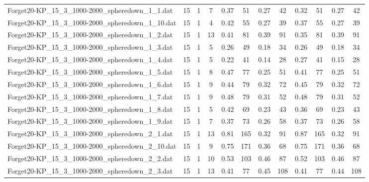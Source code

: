 \begin{sidewaystable}[!ht]
{\begin{tabular}{lccccccccccc}
Forget20-KP\_15\_3\_1000-2000\_spheredown\_1\_1.dat & 15 & 1 & 7 & 0.37 & 51 &  \textcolor{blue2}{0.27} & 42 & 0.32 & 51 &  \textcolor{blue2}{0.27} & 42 \\
Forget20-KP\_15\_3\_1000-2000\_spheredown\_1\_10.dat & 15 & 1 & 4 & 0.42 & 55 &  \textcolor{blue2}{0.27} & 39 & 0.37 & 55 &  \textcolor{blue2}{0.27} & 39 \\
Forget20-KP\_15\_3\_1000-2000\_spheredown\_1\_2.dat & 15 & 1 & 13 & 0.41 & 81 & 0.39 & 91 &  \textcolor{blue2}{0.35} & 81 & 0.39 & 91 \\
Forget20-KP\_15\_3\_1000-2000\_spheredown\_1\_3.dat & 15 & 1 & 5 & 0.26 & 49 &  \textcolor{blue2}{0.18} & 34 & 0.26 & 49 &  \textcolor{blue2}{0.18} & 34 \\
Forget20-KP\_15\_3\_1000-2000\_spheredown\_1\_4.dat & 15 & 1 & 5 & 0.22 & 41 &  \textcolor{blue2}{0.14} & 28 & 0.27 & 41 & 0.15 & 28 \\
Forget20-KP\_15\_3\_1000-2000\_spheredown\_1\_5.dat & 15 & 1 & 8 & 0.47 & 77 &  \textcolor{blue2}{0.25} & 51 & 0.41 & 77 &  \textcolor{blue2}{0.25} & 51 \\
Forget20-KP\_15\_3\_1000-2000\_spheredown\_1\_6.dat & 15 & 1 & 9 & 0.44 & 79 &  \textcolor{blue2}{0.32} & 72 & 0.45 & 79 &  \textcolor{blue2}{0.32} & 72 \\
Forget20-KP\_15\_3\_1000-2000\_spheredown\_1\_7.dat & 15 & 1 & 9 & 0.48 & 79 &  \textcolor{blue2}{0.31} & 52 & 0.48 & 79 &  \textcolor{blue2}{0.31} & 52 \\
Forget20-KP\_15\_3\_1000-2000\_spheredown\_1\_8.dat & 15 & 1 & 5 & 0.42 & 69 &  \textcolor{blue2}{0.23} & 43 & 0.36 & 69 &  \textcolor{blue2}{0.23} & 43 \\
Forget20-KP\_15\_3\_1000-2000\_spheredown\_1\_9.dat & 15 & 1 & 7 & 0.37 & 73 &  \textcolor{blue2}{0.26} & 58 & 0.37 & 73 &  \textcolor{blue2}{0.26} & 58 \\
Forget20-KP\_15\_3\_1000-2000\_spheredown\_2\_1.dat & 15 & 1 & 13 & 0.81 & 165 &  \textcolor{blue2}{0.32} & 91 & 0.87 & 165 &  \textcolor{blue2}{0.32} & 91 \\
Forget20-KP\_15\_3\_1000-2000\_spheredown\_2\_10.dat & 15 & 1 & 9 & 0.75 & 171 &  \textcolor{blue2}{0.36} & 68 & 0.75 & 171 &  \textcolor{blue2}{0.36} & 68 \\
Forget20-KP\_15\_3\_1000-2000\_spheredown\_2\_2.dat & 15 & 1 & 10 & 0.53 & 103 &  \textcolor{blue2}{0.46} & 87 & 0.52 & 103 &  \textcolor{blue2}{0.46} & 87 \\
Forget20-KP\_15\_3\_1000-2000\_spheredown\_2\_3.dat & 15 & 1 & 13 &  \textcolor{blue2}{0.41} & 77 & 0.45 & 108 &  \textcolor{blue2}{0.41} & 77 & 0.44 & 108 \\

\end{tabular}}
\end{sidewaystable}
